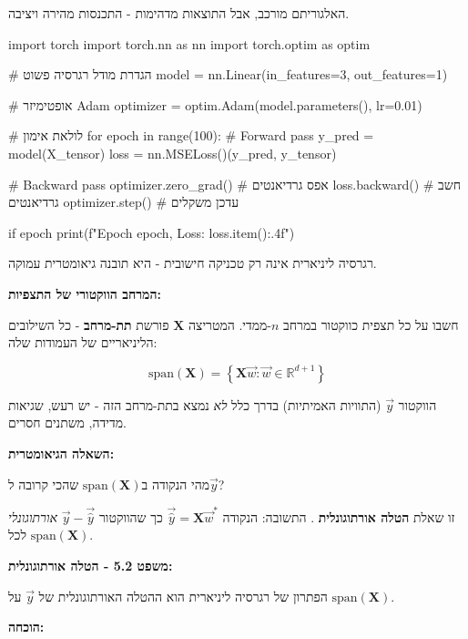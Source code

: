 האלגוריתם מורכב, אבל התוצאות מדהימות - התכנסות מהירה ויציבה.

\begin{pythonbox}
import torch
import torch.nn as nn
import torch.optim as optim

# הגדרת מודל רגרסיה פשוט
model = nn.Linear(in_features=3, out_features=1)

# אופטימיזר Adam
optimizer = optim.Adam(model.parameters(), lr=0.01)

# לולאת אימון
for epoch in range(100):
    # Forward pass
    y_pred = model(X_tensor)
    loss = nn.MSELoss()(y_pred, y_tensor)
    
    # Backward pass
    optimizer.zero_grad()  # אפס גרדיאנטים
    loss.backward()        # חשב גרדיאנטים
    optimizer.step()       # עדכן משקלים
    
    if epoch %
        print(f"Epoch {epoch}, Loss: {loss.item():.4f}")
\end{pythonbox}


רגרסיה ליניארית אינה רק טכניקה חישובית - היא תובנה גיאומטרית עמוקה.

\textbf{המרחב הווקטורי של התצפיות:}

חשבו על כל תצפית כווקטור במרחב $n$-ממדי. המטריצה $\mathbf{X}$ פורשת \textbf{תת-מרחב} - כל השילובים הליניאריים של העמודות שלה:

\begin{equation}
\text{span}(\mathbf{X}) = \left\{ \mathbf{X}\vec{w} : \vec{w} \in \mathbb{R}^{d+1} \right\}
\end{equation}

הווקטור $\vec{y}$ (התוויות האמיתיות) בדרך כלל \textit{לא} נמצא בתת-מרחב הזה - יש רעש, שגיאות מדידה, משתנים חסרים.

\textbf{השאלה הגיאומטרית:}

מהי הנקודה ב\en{-}$\text{span}(\mathbf{X})$ שהכי קרובה ל\en{-}$\vec{y}$?

זו שאלת \textbf{הטלה אורתוגונלית} . התשובה: הנקודה $\vec{\hat{y}} = \mathbf{X}\vec{w}^*$ כך שהווקטור $\vec{y} - \vec{\hat{y}}$ \textit{אורתוגונלי} לכל $\text{span}(\mathbf{X})$.

\textbf{משפט \num{5.2} - הטלה אורתוגונלית:}

הפתרון של רגרסיה ליניארית הוא ההטלה האורתוגונלית של $\vec{y}$ על $\text{span}(\mathbf{X})$.

\textbf{הוכחה:}

